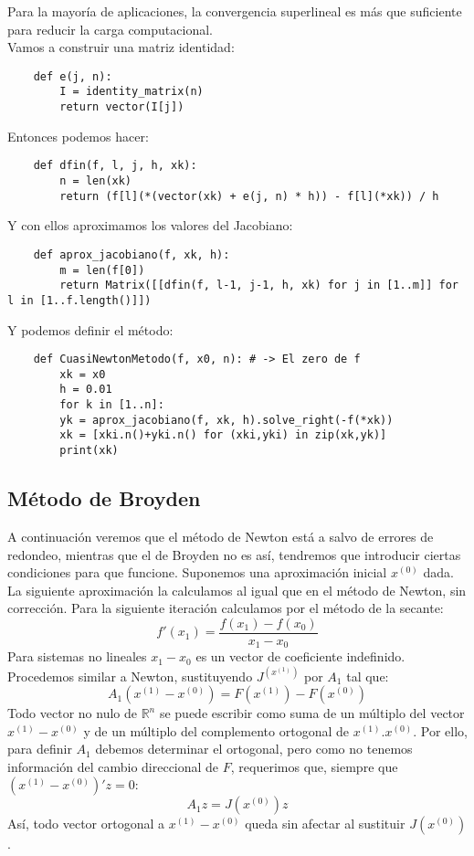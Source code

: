 Para la mayoría de aplicaciones, la convergencia superlineal es más que suficiente para reducir la carga computacional.\\
Vamos a construir una matriz identidad:
\begin{verbatim}
	def e(j, n):
		I = identity_matrix(n)
		return vector(I[j])
\end{verbatim}
Entonces podemos hacer:
\begin{verbatim}
	def dfin(f, l, j, h, xk):
		n = len(xk)
		return (f[l](*(vector(xk) + e(j, n) * h)) - f[l](*xk)) / h
\end{verbatim}
Y con ellos aproximamos los valores del Jacobiano:
\begin{verbatim}
	def aprox_jacobiano(f, xk, h):
		m = len(f[0])
		return Matrix([[dfin(f, l-1, j-1, h, xk) for j in [1..m]] for l in [1..f.length()]])
\end{verbatim}
Y podemos definir el método:
\begin{verbatim}
	def CuasiNewtonMetodo(f, x0, n): # -> El zero de f
		xk = x0
		h = 0.01
		for k in [1..n]:
		yk = aprox_jacobiano(f, xk, h).solve_right(-f(*xk))
		xk = [xki.n()+yki.n() for (xki,yki) in zip(xk,yk)]
		print(xk)
\end{verbatim}


\subsection{Método de Broyden}

A continuación veremos que el método de Newton está a salvo de errores de redondeo, mientras que el de Broyden no es así, tendremos que introducir ciertas condiciones para que funcione. 
Suponemos una aproximación inicial $x^(0)$ dada. La siguiente aproximación la calculamos al igual que en el método de Newton, sin corrección.
Para la siguiente iteración calculamos por el método de la secante:
\[f'(x_1) = \frac{f(x_1)-f(x_0)}{x_1-x_0}\]
Para sistemas no lineales $x_1 - x_0$ es un vector de coeficiente indefinido. Procedemos similar a Newton, sustituyendo $J^(x^{(1)})$ por $A_1$ tal que:
\[A_1(x^{(1)}-x^{(0)}) = F(x^{(1)})-F(x^{(0)})\]
Todo vector no nulo de $\mathbb{R}^n$ se puede escribir como suma de un múltiplo del vector $x^{(1)}-x^{(0)}$ y de un múltiplo del complemento ortogonal de $x^{(1)}.x^{(0)}$. Por ello, para definir $A_1$ debemos determinar el ortogonal, pero como no tenemos información del cambio direccional de $F$, requerimos que, siempre que $(x^{(1)}-x^{(0)})' z = 0$:
\[A_1 z = J(x^{(0)}) z\]
Así, todo vector ortogonal a $x^{(1)}-x^{(0)}$ queda sin afectar al sustituir $J(x^{(0)})$.

